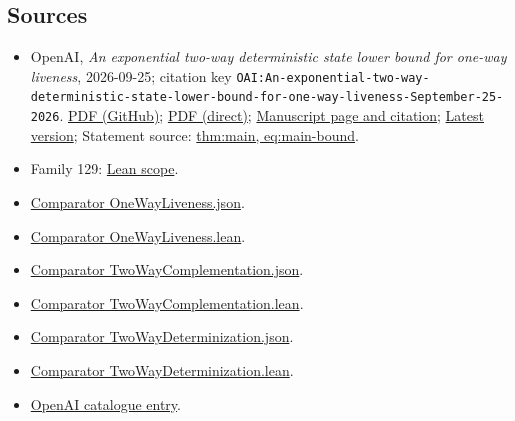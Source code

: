 \documentclass[11pt]{article}
\begin{document}
\subsection{Sources}
\begin{itemize}
\item OpenAI, \emph{An exponential two-way deterministic state lower bound for one-way liveness}, 2026-09-25; citation key \texttt{OAI:An-exponential-two-way-deterministic-state-lower-bound-for-one-way-liveness-September-25-2026}. \href{https://github.com/openai/math/blob/adc7f1241b42e322a6451854ab7e4b4c146bf78a/preprints/An-exponential-two-way-deterministic-state-lower-bound-for-one-way-liveness-September-25-2026/main.pdf}{PDF (GitHub)}; \href{https://github.com/openai/math/raw/adc7f1241b42e322a6451854ab7e4b4c146bf78a/preprints/An-exponential-two-way-deterministic-state-lower-bound-for-one-way-liveness-September-25-2026/main.pdf}{PDF (direct)}; \href{https://github.com/openai/math/blob/adc7f1241b42e322a6451854ab7e4b4c146bf78a/preprints/An-exponential-two-way-deterministic-state-lower-bound-for-one-way-liveness-September-25-2026/README.md}{Manuscript page and citation}; \href{https://github.com/openai/math/blob/main/preprints/An-exponential-two-way-deterministic-state-lower-bound-for-one-way-liveness-September-25-2026/main.pdf}{Latest version}; Statement source: \href{https://github.com/openai/math/blob/adc7f1241b42e322a6451854ab7e4b4c146bf78a/preprints/An-exponential-two-way-deterministic-state-lower-bound-for-one-way-liveness-September-25-2026/build/sections/introduction.tex\#L99}{thm:main, eq:main-bound}.
\item Family 129: \href{https://github.com/openai/math/blob/adc7f1241b42e322a6451854ab7e4b4c146bf78a/lean/docs/129.md}{Lean scope}.
\item \href{https://github.com/openai/math/blob/adc7f1241b42e322a6451854ab7e4b4c146bf78a/lean/ComparatorChallenges/OneWayLiveness.json}{Comparator OneWayLiveness.json}.
\item \href{https://github.com/openai/math/blob/adc7f1241b42e322a6451854ab7e4b4c146bf78a/lean/ComparatorChallenges/OneWayLiveness.lean}{Comparator OneWayLiveness.lean}.
\item \href{https://github.com/openai/math/blob/adc7f1241b42e322a6451854ab7e4b4c146bf78a/lean/ComparatorChallenges/TwoWayComplementation.json}{Comparator TwoWayComplementation.json}.
\item \href{https://github.com/openai/math/blob/adc7f1241b42e322a6451854ab7e4b4c146bf78a/lean/ComparatorChallenges/TwoWayComplementation.lean}{Comparator TwoWayComplementation.lean}.
\item \href{https://github.com/openai/math/blob/adc7f1241b42e322a6451854ab7e4b4c146bf78a/lean/ComparatorChallenges/TwoWayDeterminization.json}{Comparator TwoWayDeterminization.json}.
\item \href{https://github.com/openai/math/blob/adc7f1241b42e322a6451854ab7e4b4c146bf78a/lean/ComparatorChallenges/TwoWayDeterminization.lean}{Comparator TwoWayDeterminization.lean}.
\item \href{https://github.com/openai/math/blob/adc7f1241b42e322a6451854ab7e4b4c146bf78a/CONTENTS.md}{OpenAI catalogue entry}.
\end{itemize}
\end{document}
